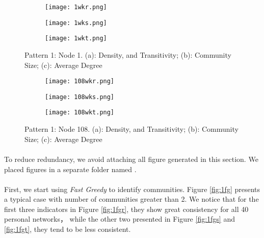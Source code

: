 \begin{figure}[h!]
	\centering
	\begin{subfigure}{.5\textwidth}
		\centering
		\texttt{[image: 1wkr.png]}
		\caption{}		
		\label{fig:1wkr}
	\end{subfigure}%
	\begin{subfigure}{.5\textwidth}
		\centering
		\texttt{[image: 1wks.png]}
		\caption{}	
		\label{fig:1wks}
	\end{subfigure}
	\begin{subfigure}{.5\textwidth}
		\centering
		\texttt{[image: 1wkt.png]}
		\caption{}	
		\label{fig:1wkt}
	\end{subfigure}
	\caption{Pattern 1: Node 1. (a): Density, and Transitivity; (b): Community Size; (c): Average Degree}
	\label{fig:1wk}
\end{figure}

\begin{figure}[h!]
	\centering
	\begin{subfigure}{.5\textwidth}
		\centering
		\texttt{[image: 108wkr.png]}
		\caption{}		
		\label{fig:108wkr}
	\end{subfigure}%
	\begin{subfigure}{.5\textwidth}
		\centering
		\texttt{[image: 108wks.png]}
		\caption{}	
		\label{fig:108wks}
	\end{subfigure}
	\begin{subfigure}{.5\textwidth}
		\centering
		\texttt{[image: 108wkt.png]}
		\caption{}	
		\label{fig:108wkt}
	\end{subfigure}
	\caption{Pattern 1: Node 108. (a): Density, and Transitivity; (b): Community Size; (c): Average Degree}
	\label{fig:108wk}
\end{figure}

\paragraph{}
To reduce redundancy, we avoid attaching all figure generated in this section. We placed figures in a separate folder named .

\paragraph{}
First, we start using \textit{Fast Greedy} to identify communities. Figure \ref{fig:1fg} presents a typical case with number of communities greater than 2. We notice that for the first three indicators in Figure \ref{fig:1fgr}, they show great consistency for all 40 personal networks， while the other two presented in Figure \ref{fig:1fgs} and \ref{fig:1fgt}, they tend to be less consistent. 
